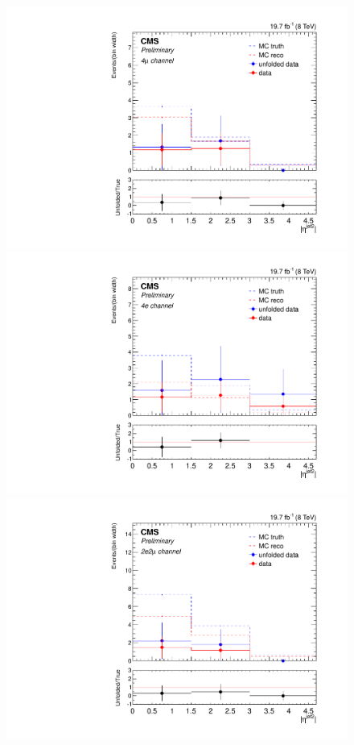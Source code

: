 \begin{figure}[hbtp]
  \begin{center}
    \includegraphics[width=\cmsFigWidth]{Figures/EtaJet2_ZZTo4m_Mad_fr_binwidth}
    \includegraphics[width=\cmsFigWidth]{Figures/EtaJet2_ZZTo4e_Mad_fr_binwidth}
    \includegraphics[width=\cmsFigWidth]{Figures/EtaJet2_ZZTo2e2m_Mad_fr_binwidth}  

\end{center}
\end{figure}
